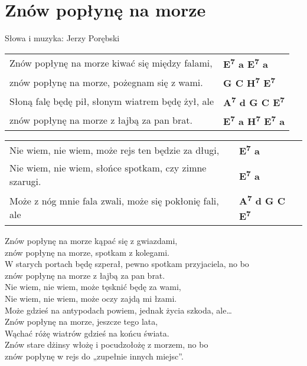 \section{Znów popłynę na morze}

Słowa i muzyka: Jerzy Porębski

\vspace{2em}
\begin{tabular}{@{}p{10cm}@{}l@{}}
Znów popłynę na morze kiwać się między falami, & \bfseries E\textsuperscript{7} a E\textsuperscript{7} a \\
znów popłynę na morze, pożegnam się z wami. & \bfseries G C H\textsuperscript{7} E\textsuperscript{7} \\
Słoną falę będę pił, słonym wiatrem będę żył, ale & \bfseries A\textsuperscript{7} d G C E\textsuperscript{7} \\
znów popłynę na morze z łajbą za pan brat. & \bfseries E\textsuperscript{7} a H\textsuperscript{7} E\textsuperscript{7} a \\
\end{tabular}

\vspace{1em}
\begin{tabular}{@{}p{10cm}@{}l@{}}
Nie wiem, nie wiem, może rejs ten będzie za długi,  & \bfseries E\textsuperscript{7} a \\
Nie wiem, nie wiem, słońce spotkam, czy zimne szarugi.  & \bfseries E\textsuperscript{7} a \\
Może z nóg mnie fala zwali, może się pokłonię fali, ale  & \bfseries A\textsuperscript{7} d G C E\textsuperscript{7} \\
\end{tabular}

\vspace{1em}
Znów popłynę na morze kąpać się z gwiazdami, \\
znów popłynę na morze, spotkam z kolegami. \\
W starych portach będę szperał, pewno spotkam przyjaciela, no bo \\
znów popłynę na morze z łajbą za pan brat.  \\

Nie wiem, nie wiem, może tęsknić będę za wami, \\
Nie wiem, nie wiem, może oczy zajdą mi łzami. \\
Może gdzieś na antypodach powiem, jednak życia szkoda, ale… \\

Znów popłynę na morze, jeszcze tego lata, \\
Wąchać różę wiatrów gdzieś na końcu świata. \\
Znów stare dżinsy włożę i pocudzołożę z morzem, no bo \\
znów popłynę w rejs do „zupełnie innych miejsc”. \\